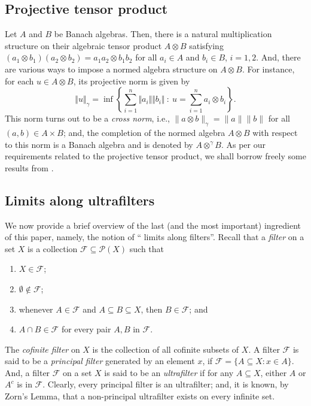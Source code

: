 \documentclass[a4]{amsart}
\theoremstyle{cupthm}
\theoremstyle{cupdefn}
\theoremstyle{cuprem}
\numberwithin{equation}{section}
\begin{document}
\subsection{Projective tensor product}
       Let $A$ and $B$ be Banach algebras. Then, there is a natural
       multiplication structure on their algebraic tensor product $A \otimes B$
       satisfying $(a_1\otimes b_1)(a_2\otimes b_2)=a_1a_2\otimes
       b_1b_2$ for all $a_i \in A$ and $b_i \in B$, $i=1,2$. And, there
       are various ways to impose a normed algebra structure on $A
       \otimes B$.  For instance, for each $u \in A\otimes B$, its
       projective norm is given by
        \[
       \Vert u \Vert_\gamma =\inf\left\{\sum_{i=1}^{n}\Vert a_i\Vert
       \Vert b_i\Vert~:~u=\sum_{i=1}^{n}a_i\otimes b_i\right\}.
       \]
       This norm turns out to be a \textit{cross norm}, i.e., $\|a
       \otimes b\|_{\gamma} = \|a\| \|b\|$ for all $(a,b) \in A \times
       B$; and, the completion of the normed algebra $A\otimes B$ with
       respect to this norm is a Banach algebra and is denoted by
       $A\otimes^\gamma B$.  As per our requirements related to the
       projective tensor product, we shall borrow  freely some results from \cite{Ryan}.

\subsection{Limits along ultrafilters}
We now provide a brief overview of the last (and the most important)
ingredient of this paper, namely, the notion of `` limits along 
  filters''. Recall that a {\em filter} on a set $X$ is a
collection $\mathcal{F} \subseteq \mathcal{P}(X)$ such that
\begin{enumerate}
\item $X \in \mathcal{F}$;
\item $\emptyset \notin \mathcal{F}$;
\item whenever $A \in \mathcal{F}$ and $A \subseteq B\subseteq X$, then $B \in
  \mathcal{F}$; and
  \item $A \cap B \in \mathcal{F}$ for every pair $A, B$ in
    $\mathcal{F}$.
\end{enumerate}
The {\em cofinite filter}  on $X$ is the collection of all cofinite subsets
of $X$. A filter $\mathcal{F}$ is said to be a {\em principal filter}
generated by an element $x$, if $\mathcal{F}=\{ A \subseteq X: x \in
A\}$.  And, a filter $\mathcal{F}$ on a set $X$ is said to be an {\em
  ultrafilter} if for any $A \subseteq X$, either $A$ or $A^c$ is in
$\mathcal{F}$. Clearly, every principal filter is an ultrafilter; and,
it is known, by Zorn's Lemma, that a non-principal ultrafilter exists
on every infinite set.
\end{document}
